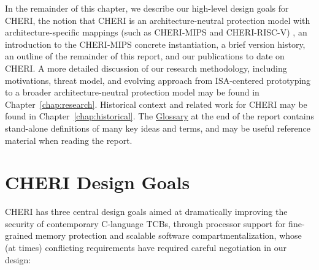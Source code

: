 In the remainder of this chapter, we describe  our high-level design goals
for CHERI, the notion that CHERI is an architecture-neutral protection model
with architecture-specific mappings (such as CHERI-MIPS and CHERI-RISC-V)%
, an
introduction to the CHERI-MIPS concrete instantiation, a brief version
history, an outline of the remainder of this report, and our publications to
date on CHERI.
A more detailed discussion of our research methodology, including motivations,
threat model, and evolving approach from ISA-centered prototyping to a broader
architecture-neutral protection model may be found in
Chapter~\ref{chap:research}.
Historical context and related work for CHERI may be found in
Chapter~\ref{chap:historical}.
The \hyperref[glossary]{Glossary} at the end of the report contains
stand-alone definitions of many key ideas and terms, and may be useful
reference material when reading the report.

\section{CHERI Design Goals}

CHERI has three central design goals aimed at dramatically improving the
security of contemporary C-language TCBs, through processor support for
fine-grained memory protection and scalable software compartmentalization,
whose (at times) conflicting requirements have required careful negotiation in
our design:

